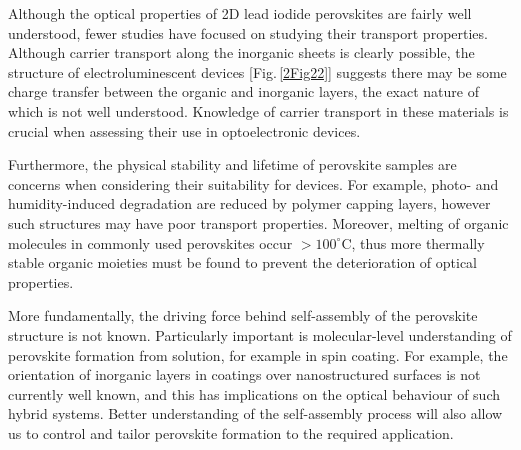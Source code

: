 Although the optical properties of 2D lead iodide perovskites are fairly well understood, fewer studies have focused on studying their transport properties. Although carrier transport along the inorganic sheets is clearly possible, the structure of electroluminescent devices [Fig.\,\ref{2Fig22}] suggests there may be some charge transfer between the organic and inorganic layers, the exact nature of which is not well understood. Knowledge of carrier transport in these materials is crucial when assessing their use in optoelectronic devices.

Furthermore, the physical stability and lifetime of perovskite samples are concerns when considering their suitability for devices. For example, photo- and humidity-induced degradation are reduced by polymer capping layers, however such structures may have poor transport properties. Moreover, melting of organic molecules in commonly used perovskites occur $>100^{\circ}$C, thus more thermally stable organic moieties must be found to prevent the deterioration of optical properties. 

More fundamentally, the driving force behind self-assembly of the perovskite structure is not known. Particularly important is molecular-level understanding of perovskite formation from solution, for example in spin coating. For example, the orientation of inorganic layers in coatings over nanostructured surfaces is not currently well known, and this has implications on the optical behaviour of such hybrid systems. Better understanding of the self-assembly process will also allow us to control and tailor perovskite formation to the required application.